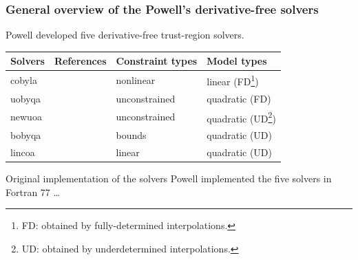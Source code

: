 \documentclass[usenames,dvipsnames,10pt]{beamer}
\begin{document}
\begin{frame}
    \frametitle{General overview of the Powell's derivative-free solvers}

    Powell developed five \alert{derivative-free trust-region} solvers.

    \begin{minipage}{\textwidth}
        \setcounter{mpfootnote}{\value{footnote}}
        \renewcommand{\thempfootnote}{\arabic{mpfootnote}}
        \begin{table}
            \centering
            \begin{tabular}{@{}llll@{}}
                \toprule
                \textbf{Solvers}    & \textbf{References}       & \textbf{Constraint types} & \textbf{Model types}\\
                \midrule
                \gls{cobyla}        & \textcite{Powell_1994}    & nonlinear                 & linear (FD\footnote{FD: obtained by fully-determined interpolations.})\\
                \gls{uobyqa}        & \textcite{Powell_2002}    & unconstrained             & quadratic (FD)\\
                \gls{newuoa}        & \textcite{Powell_2006}    & unconstrained             & quadratic (UD\footnote{UD: obtained by underdetermined interpolations.})\\
                \gls{bobyqa}        & \textcite{Powell_2009}    & bounds                    & quadratic (UD)\\
                \gls{lincoa}        & \textcite{Powell_2015}    & linear                    & quadratic (UD)\\
                \bottomrule
            \end{tabular}
        \end{table}
        \setcounter{footnote}{\value{mpfootnote}}
    \end{minipage}

    \begin{exampleblock}{Original implementation of the solvers}
        Powell implemented the five solvers in \alert{Fortran 77} \dots
    \end{exampleblock}
\end{frame}
\end{document}
